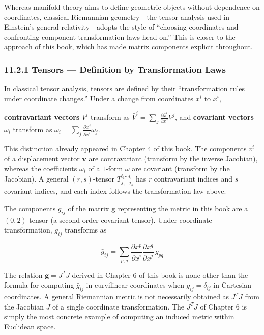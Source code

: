 Whereas manifold theory aims to define geometric objects without
dependence on coordinates, classical Riemannian geometry---the tensor
analysis used in Einstein's general relativity---adopts the style of
``choosing coordinates and confronting component transformation laws
head-on.'' This is closer to the approach of this book, which has made
matrix components explicit throughout.

\hypertarget{tensors-definition-by-transformation-laws}{%
\subsubsection{11.2.1 Tensors --- Definition by Transformation
Laws}\label{tensors-definition-by-transformation-laws}}

In classical tensor analysis, tensors are defined by their
``transformation rules under coordinate changes.'' Under a change from
coordinates \(x^i\) to \(\bar{x}^i\),

\textbf{contravariant vectors} \(V^i\) transform as
\(\bar{V}^i = \sum_j \frac{\partial \bar{x}^i}{\partial x^j} V^j\), and
\textbf{covariant vectors} \(\omega_i\) transform as
\(\bar{\omega}_i = \sum_j \frac{\partial x^j}{\partial \bar{x}^i} \omega_j\).

This distinction already appeared in Chapter 4 of this book. The
components \(v^i\) of a displacement vector \(\mathbf{v}\) are
contravariant (transform by the inverse Jacobian), whereas the
coefficients \(\omega_i\) of a \(1\)-form \(\omega\) are covariant
(transform by the Jacobian). A general \((r,s)\)-tensor
\(T^{i_1\cdots i_r}_{j_1\cdots j_s}\) has \(r\) contravariant indices
and \(s\) covariant indices, and each index follows the transformation
law above.

The components \(g_{ij}\) of the matrix \(\mathbf{g}\) representing the
metric in this book are a \((0,2)\)-tensor (a second-order covariant
tensor). Under coordinate transformation, \(g_{ij}\) transforms as

\[\bar{g}_{ij} = \sum_{p,q} \frac{\partial x^p}{\partial \bar{x}^i} \frac{\partial x^q}{\partial \bar{x}^j}\,g_{pq}\]

The relation \(\mathbf{g} = J^T J\) derived in Chapter 6 of this book is
none other than the formula for computing \(\bar{g}_{ij}\) in
curvilinear coordinates when \(g_{ij} = \delta_{ij}\) in Cartesian
coordinates. A general Riemannian metric is not necessarily obtained as
\(J^T J\) from the Jacobian \(J\) of a single coordinate transformation.
The \(J^T J\) of Chapter 6 is simply the most concrete example of
computing an induced metric within Euclidean space.

